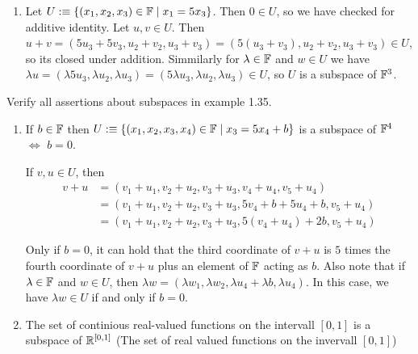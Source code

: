 \begin{xrcs}
\begin{xsol}
\begin{enumerate}
    \item Let $U :\equiv \{(x_1, x_2, x_3) \in \mathbb{F} \mid x_1 = 5x_3\}$. Then $0 \in U$, so we have checked for additive identity. Let $u,v \in U$. Then $u+v= (5u_3+5v_3, u_2+v_2, u_3+v_3) = (5(u_3+v_3), u_2+v_2, u_3+v_3) \in U$, so its closed under addition. Simmilarly for $\lambda \in \mathbb{F}$ and $w \in U$ we have $\lambda u = (\lambda 5u_3, \lambda u_2, \lambda u_3) = (5 \lambda u_3, \lambda u_2, \lambda u_3) \in U$, so $U$ is a subspace of $\mathbb{F}^3$.
  \end{enumerate}
  \end{xsol}

\end{xrcs}


\begin{xrcs}
  Verify all assertions about subspaces in example 1.35.

  \begin{enumerate}
    \item {
      If $b \in \mathbb{F}$ then $U :\equiv \{(x_1, x_2, x_3, x_4) \in \mathbb{F} \mid x_3 = 5x_4+b \}$ is a subspace of $\mathbb{F}^4$ $\iff$ $b=0$.

      \begin{xsol}
        If $v,u \in U$, then
        \begin{equation}
          \begin{aligned}
            v+u & = (v_1+u_1, v_2+u_2, v_3+u_3, v_4+u_4, v_5+u_4) \\
            & = (v_1+u_1, v_2+u_2, v_3+u_3, 5v_4+b+5u_4+b, v_5+u_4) \\
            & = (v_1+u_1, v_2+u_2, v_3+u_3, 5(v_4 + u_4) + 2b, v_5+u_4)
          \end{aligned}
        \end{equation}

        Only if $b=0$, it can hold that the third coordinate of $v+u$ is $5$ times the fourth coordinate of $v+u$ plus an element of $\mathbb{F}$ acting as $b$. %
        Also note that if $\lambda \in \mathbb{F}$ and $w \in U$, then $\lambda w = (\lambda w_1, \lambda w_2, \lambda u_4 + \lambda b, \lambda u_4)$. In this case, we have $\lambda w \in U$ if and only if $b=0$.
      \end{xsol}
    }

    \item{
      The set of continious real-valued functions on the intervall $[0,1]$ is a subspace of $\mathbb{R}^{[0,1]}$ (The set of real valued functions on the invervall $[0,1]$)

}
\end{enumerate}
\end{xrcs}
